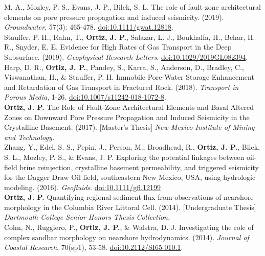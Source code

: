\documentclass[11pt, letterpaper]{article}
\newcommand{\years}[1]{\marginnote{\scriptsize #1}}
\begin{document}
M. A., Mozley, P. S., Evans, J. P., Bilek, S. L. The role of fault-zone
architectural elements on pore pressure propagation and induced seismicity.
(2019). \emph{Groundwater}, 57(3): 465-478. 
\href{https://ngwa.onlinelibrary.wiley.com/doi/epdf/10.1111/gwat.12818}{doi:10.1111/gwat.12818}.
\GroundwaterOOOOTheRoleofFaultZoneAr\\
%
\years{2019}Stauffer, P. H., Rahn, T., \textbf{Ortiz, J. P.}, Salazar, L. J.,
Boukhalfa, H., Behar, H. R., Snyder, E. E. Evidence for High Rates of Gas
Transport in the Deep Subsurface. (2019). \emph{Geophysical Research Letters}.
\href{https://agupubs.onlinelibrary.wiley.com/doi/epdf/10.1029/2019GL082394}{doi:10.1029/2019GL082394}.
\GeophysicalResearchLOOOOEvidenceforHighRates\\ 
%
\years{2018}Harp, D. R., \textbf{Ortiz, J. P.},
Pandey, S., Karra, S., Anderson, D., Bradley, C., Viswanathan, H., \& Stauffer,
P. H. Immobile Pore-Water Storage Enhancement and Retardation of Gas Transport
in Fractured Rock. (2018). \emph{Transport in Porous Media}, 1-26.
\href{https://link.springer.com/content/pdf/10.1007/s11242-018-1072-8.pdf}{doi:10.1007/s11242-018-1072-8}.
\TransportinPorousMedOOOOImmobileporewatersto\\ 
%
\years{2017}\textbf{Ortiz, J. P.} The Role of Fault-Zone Architectural Elements
and Basal Altered Zones on Downward Pore Pressure Propagation and Induced
Seismicity in the Crystalline Basement. (2017). [Master's Thesis] \emph{New
Mexico Institute of Mining and Technology.}
\NewMexicoInstituteofOOOOTheRoleofFaultZoneAr\\ 
%
\years{2016}Zhang, Y., Edel, S. S., Pepin, J., Person, M., Broadhead, R.,
\textbf{Ortiz, J. P.}, Bilek, S. L., Mozley, P. S., \& Evans, J.  P. Exploring
the potential linkages between oil-field brine reinjection, crystalline
basement permeability, and triggered seismicity for the Dagger Draw Oil field,
southeastern New Mexico, USA, using hydrologic modeling. (2016). \emph{Geofluids}.
\href{https://onlinelibrary.wiley.com/doi/epdf/10.1111/gfl.12199}{doi:10.1111/gfl.12199}
\GeofluidsOOOOExploringthepotentia\\
%
\years{2014}\textbf{Ortiz, J. P.} Quantifying regional sediment flux from
observations of nearshore morphology in the Columbia River Littoral Cell.
(2014). [Undergraduate Thesis] \emph{Dartmouth College Senior Honors Thesis
Collection.}\\ 
%
\years{2014}Cohn, N., Ruggiero, P., \textbf{Ortiz, J. P.}, \& Walstra, D. J.
Investigating the role of complex sandbar morphology on nearshore
hydrodynamics. (2014). \emph{Journal of Coastal Research}, 70(sp1), 53-58.
\href{https://bioone.org/journalArticle/Download?urlId=10.2112%2FSI65-010.1}{doi:10.2112/SI65-010.1}.
\JournalofCoastalReseOOOOInvestigatingtherole
\end{document}
